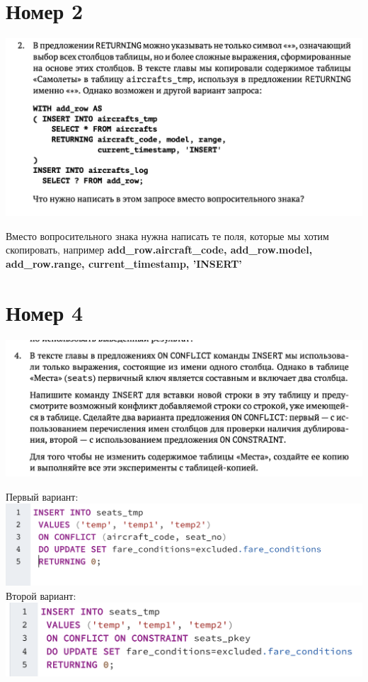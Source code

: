 \documentclass[a4paper,12pt]{article}
\begin{document}
\clearpage
\section*{Номер 2}
\begin{center}
\includegraphics[scale=0.8]{t2.png}
\end{center}
Вместо вопросительного знака нужна написать те поля, которые мы хотим скопировать, например \textbf{add\_row.aircraft\_code, add\_row.model, add\_row.range, current\_timestamp, 'INSERT'}
\clearpage

\section*{Номер 4}
\begin{center}
\includegraphics[scale=0.8]{t4.png}
\end{center}
Первый вариант:
\\
\includegraphics[scale=0.8]{41}
\\
Второй вариант:
\\
\includegraphics[scale=0.8]{42}
\end{document}
